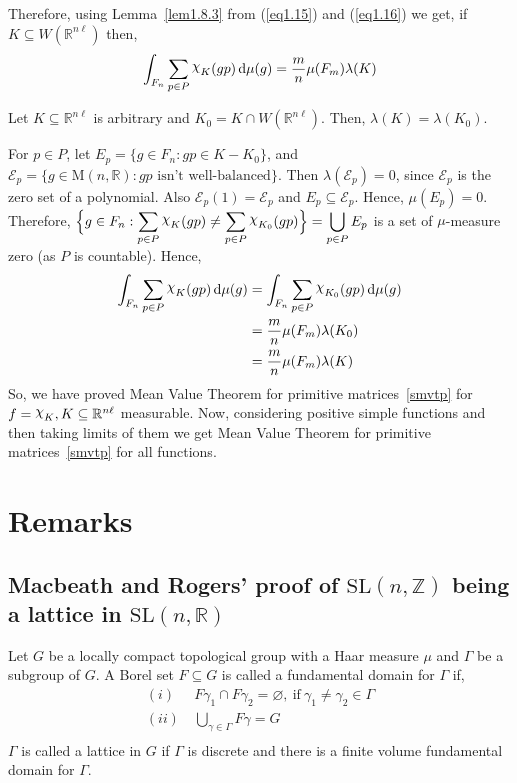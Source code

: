\documentclass[11pt]{article}
\theoremstyle{definition}
\newcommand{\mychi}{\raisebox{2pt}{$\chi$}}
\begin{document}
Therefore, using Lemma~\ref{lem1.8.3} from (\ref{eq1.15}) and (\ref{eq1.16}) we get, if $K \subseteq W(\mathbb{R}^{n \ell})$ then,
\[
    \int_{F_n} \displaystyle\sum_{p \in P} \mychi_{K} (gp) \, \mathrm{d} \mu (g) = \frac{m}{n} \mu (F_m) \lambda (K)
\]

Let $K \subseteq \mathbb{R}^{n \ell }$ is arbitrary and $K_0 = K \cap W(\mathbb{R}^{n\ell })$.
Then, $\lambda (K)= \lambda (K_0)$.

For $p \in P$, let  $E_p=\{g \in F_n : gp \in K-K_0\}$, and $\mathcal{E}_p= \{g \in \mathrm{M}(n, \mathbb{R}): gp \text{ isn't well-balanced}\}$.
Then $\lambda ( \mathcal{E}_p)=0$, since $\mathcal{E}_p$ is the zero set of a polynomial.
Also $\mathcal{E}_p(1) =\mathcal{E}_p$ and $E_p \subseteq \mathcal{E}_p$.
Hence, $\mu (E_p) = 0$.
Therefore, $\Big\{g \in F_n : \displaystyle\sum_{p \in P} \mychi _K(gp) \neq \displaystyle\sum_{p \in P}\mychi _{K_0} (gp)\Big\} = \bigcup _{p \in P}E_p$ is a set of $\mu$-measure zero (as $P$ is countable).
Hence,
\begin{align*}
    \int_{F_n} \displaystyle\sum_{p \in P} \mychi _K (gp) \, \mathrm{d} \mu (g)
    &=\int_{F_n} \displaystyle\sum_{p \in P} \mychi _{K_0} (gp) \, \mathrm{d} \mu (g) \\
    &= \frac{m}{n} \mu (F_m) \lambda (K_0) \\
    &= \frac{m}{n} \mu (F_m) \lambda (K)
\end{align*}
So, we have proved Mean Value Theorem for primitive matrices~\ref{smvtp} for $f= \mychi _K, K \subseteq \mathbb{R}^{n \ell }$ measurable.
Now, considering positive simple functions and then taking limits of them we get Mean Value Theorem for primitive matrices~\ref{smvtp} for all functions.

\section{Remarks}
\subsection{Macbeath and Rogers' proof of $\mathrm{SL}(n, \mathbb{Z})$ being a lattice in $\mathrm{SL}(n, \mathbb{R})$}
Let $G$ be a locally compact topological group with a Haar measure $\mu$ and $\Gamma$ be a subgroup of $G$.
A Borel set $F \subseteq G$ is called a fundamental domain for $\Gamma$ if,
\begin{align*}\label{eq1.18}
    (i)& \ F \gamma _1 \cap F \gamma _2 = \varnothing, \ \text{if} \ \gamma _1 \neq \gamma _2 \in \Gamma \\
    (ii)& \ \bigcup_{\gamma \in \Gamma } F \gamma = G \\
\end{align*}
$\Gamma$ is called a lattice in $G$ if $\Gamma$ is discrete and there is a finite volume fundamental domain for $\Gamma$.
\end{document}
